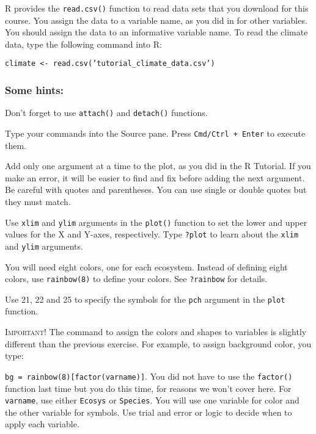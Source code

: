 \documentclass[11pt]{article}
\begin{document}
	R provides the \texttt{read.csv()} function to read data sets that you download for this course. You assign the data to a variable name, as you did in for other variables.
	You should assign the data to an informative variable name. To read the climate 
	data, type the following command into R:
	
	
	\texttt{climate \textless{}-
		read.csv('tutorial\_climate\_data.csv')}
		
	\subsubsection*{Some hints:}
	
	Don't forget to use \texttt{attach()} and \texttt{detach()} functions.
	
	Type your commands into the Source pane. Press \texttt{Cmd/Ctrl + Enter} to execute them.
	
	Add only one argument at a time to the plot, as you
	did in the R Tutorial. If you make an error, it will be easier to find and fix
	before adding the next argument. Be careful with quotes and parentheses. You can use single or double quotes but they must match.
	
	Use \texttt{xlim} and \texttt{ylim} arguments in the \texttt{plot()} function to set the lower and
	upper values for the X and Y-axes, respectively. Type \texttt{?plot} to learn about
	the \texttt{xlim} and \texttt{ylim} arguments.
	
	
	You will need eight colors, one for each ecosystem. Instead of defining
	eight colors, use \texttt{rainbow(8)} to define your colors. See \texttt{?rainbow} for
	details.
	
	Use 21, 22 and 25 to specify the symbols for the \texttt{pch} argument in the
	\texttt{plot} function.
	
	\textsc{Important!} The command to assign the colors and shapes to variables is slightly different than the previous exercise. For example, to assign background color, you type:
	
	\texttt{bg = rainbow(8)[factor(varname)]}. You did not have to use the \texttt{factor()} function last time but you do this time, for reasons we won't cover here. For \texttt{varname}, use either \texttt{Ecosys} or \texttt{Species}. You will use one variable for color and the other variable for symbols. Use trial and error or logic to decide when to apply each variable. 
	
\end{document}
